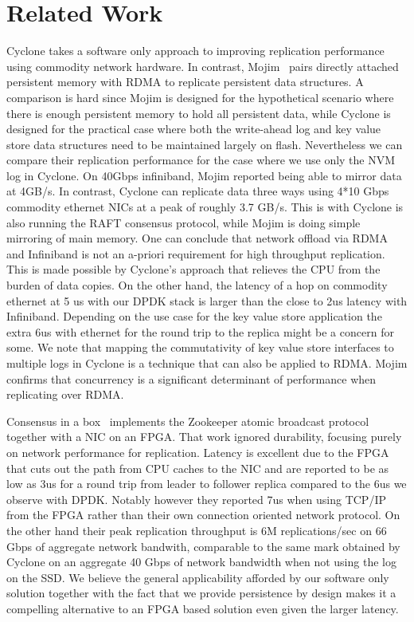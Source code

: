 \documentclass[pageno]{jpaper}
\begin{document}
\section{Related Work}

Cyclone takes a software only approach to improving replication performance
using commodity network hardware. In contrast, Mojim~\cite{mojim} pairs directly
attached persistent memory with RDMA to replicate persistent data structures. A
comparison is hard since Mojim is designed for the hypothetical scenario where
there is enough persistent memory to hold all persistent data, while Cyclone is
designed for the practical case where both the write-ahead log and key value
store data structures need to be maintained largely on flash. Nevertheless we
can compare their replication performance for the case where we use only the NVM
log in Cyclone. On 40Gbps infiniband, Mojim reported being able to mirror data
at 4GB/s. In contrast, Cyclone can replicate data three ways using 4*10 Gbps
commodity ethernet NICs at a peak of roughly 3.7 GB/s. This is with
Cyclone is also running the RAFT consensus protocol, while Mojim is doing simple
mirroring of main memory. One can conclude that network offload via RDMA and
Infiniband is not an a-priori requirement for high throughput replication. This
is made possible by Cyclone's approach that relieves the CPU from the burden of
data copies. On the other hand, the latency of a hop on commodity ethernet at 5 us with
our DPDK stack is larger than the close to 2us latency with
Infiniband. Depending on the use case for the key value store application the
extra 6us with ethernet for the round trip to the replica might be a concern for
some. We note that mapping the commutativity of key value store
interfaces to multiple logs in Cyclone is a technique that can also be applied
to RDMA. Mojim confirms that concurrency is a significant
determinant of performance when replicating over RDMA.

Consensus in a box~\cite{consensus_box} implements the Zookeeper atomic
broadcast protocol together with a NIC on an FPGA. That work ignored durability,
focusing purely on network performance for replication. Latency is
excellent due to the FPGA that cuts out the path from CPU caches to the NIC and
are reported to be as low as 3us for a round trip from leader to follower
replica compared to the 6us we observe with DPDK. Notably however they reported
7us when using TCP/IP from the FPGA rather than their own connection oriented
network protocol. On the other hand their peak replication throughput is 6M
replications/sec on 66 Gbps of aggregate network bandwith, comparable to the
same mark obtained by Cyclone on an aggregate 40 Gbps of network bandwidth when
not using the log on the SSD. We believe the general applicability afforded by
our software only solution together with the fact that we provide persistence by
design makes it a compelling alternative to an FPGA based solution even given
the larger latency.
\end{document}
